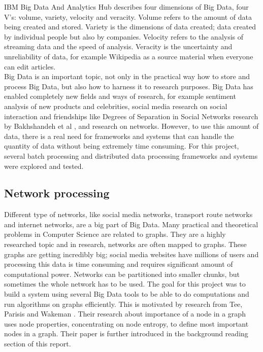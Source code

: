 \documentclass{article}
\theoremstyle{definition}
\begin{document}
IBM Big Data And Analytics Hub describes four dimensions of Big Data, four V's: volume, variety, velocity and veracity. Volume refers to the amount of data being created and stored. Variety is the dimensions of data created; data created by individual people but also by companies. Velocity refers to the analysis of streaming data and the speed of analysis. Veracity is the uncertainty and unreliability of data, for example Wikipedia as a source material when everyone can edit articles. \\

Big Data is an important topic, not only in the practical way how to store and process Big Data, but also how to harness it to research purposes. Big Data has enabled completely new fields and ways of research, for example sentiment analysis of new products and celebrities, social media research on social interaction and friendships like Degrees of Separation in Social Networks research by Bakhshandeh et al \cite{sixdegrees}, and research on networks. However, to use this amount of data, there is a real need for frameworks and systems that can handle the quantity of data without being extremely time consuming. For this project, several batch processing and distributed data processing frameworks and systems were explored and tested. \\

\subsection{Network processing}
Different type of networks, like social media networks, transport route networks and internet networks, are a big part of Big Data. Many practical and theoretical problems in Computer Science are related to graphs. They are a highly researched topic and in research, networks are often mapped to graphs. These graphs are getting incredibly big; social media websites have millions of users and processing this data is time consuming and requires significant amount of computational power. Networks can be partitioned into smaller chunks, but sometimes the whole network has to be used. The goal for this project was to build a system using several Big Data tools to be able to do computations and run algorithms on graphs efficiently. This is motivated by research from Tee, Parisis and Wakeman \cite{Tee2016b}. Their research about importance of a node in a graph uses node properties, concentrating on node entropy, to define most important nodes in a graph. Their paper is further introduced in the background reading section of this report. \\
\end{document}
